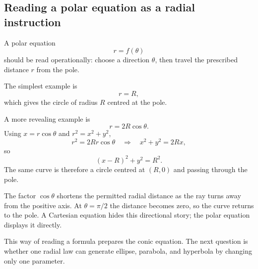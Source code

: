 \subsection{Reading a polar equation as a radial instruction}

A polar equation
\[
r=f(\theta)
\]
should be read operationally: choose a direction $\theta$, then travel the
prescribed distance $r$ from the pole.

The simplest example is
\[
\boxed{r=R},
\]
which gives the circle of radius $R$ centred at the pole.

A more revealing example is
\[
\boxed{r=2R\cos\theta}.
\]
Using $x=r\cos\theta$ and $r^2=x^2+y^2$,
\[
r^2=2Rr\cos\theta
\quad\Longrightarrow\quad
x^2+y^2=2Rx,
\]
so
\[
\boxed{(x-R)^2+y^2=R^2}.
\]
The same curve is therefore a circle centred at $(R,0)$ and passing through the
pole.

\begin{center}
\end{center}

\begin{interpretationbox}
The factor $\cos\theta$ shortens the permitted radial distance as the ray turns
away from the positive axis. At $\theta=\pi/2$ the distance becomes zero, so the
curve returns to the pole. A Cartesian equation hides this directional story;
the polar equation displays it directly.
\end{interpretationbox}

This way of reading a formula prepares the conic equation. The next question is
whether one radial law can generate ellipse, parabola, and hyperbola by changing
only one parameter.
